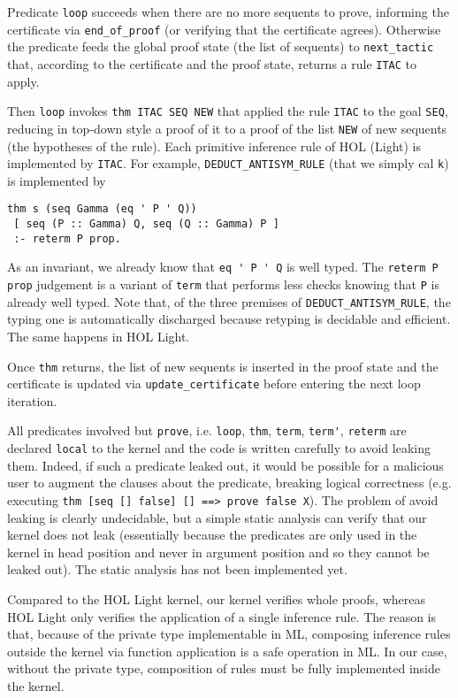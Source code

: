 \documentclass[preprint]{sigplanconf}
\begin{document}
Predicate \verb+loop+ succeeds when there are no more sequents to prove, informing the certificate via \verb+end_of_proof+ (or verifying that the certificate agrees). Otherwise the predicate feeds the global proof state (the list of sequents) to \verb+next_tactic+ that, according to the certificate and the proof state, returns a rule \verb+ITAC+ to apply.

Then \verb+loop+ invokes \verb+thm ITAC SEQ NEW+ that applied the rule \verb+ITAC+ to the goal \verb+SEQ+, reducing in top-down style a proof of it to a proof of the list \verb+NEW+ of new sequents (the hypotheses of the rule). Each primitive inference rule of HOL (Light) is implemented by \verb+ITAC+. For example, \verb+DEDUCT_ANTISYM_RULE+ (that we simply cal \verb+k+) is implemented by

{\small
\begin{verbatim}
thm s (seq Gamma (eq ' P ' Q))
 [ seq (P :: Gamma) Q, seq (Q :: Gamma) P ]
 :- reterm P prop.
\end{verbatim}}

As an invariant, we already know that \verb+eq ' P ' Q+ is well typed. The \verb+reterm P prop+ judgement is a variant of \verb+term+ that performs less checks knowing that \verb+P+ is already well typed. Note that, of the three premises of \verb+DEDUCT_ANTISYM_RULE+, the typing one is automatically discharged because retyping is decidable and efficient. The same happens in HOL Light.

Once \verb+thm+ returns, the list of new sequents is inserted in the
proof state and the certificate is updated via \verb+update_certificate+ before entering the next loop iteration.

All predicates involved but \verb+prove+, i.e. \verb+loop+, \verb+thm+, \verb+term+, \verb+term'+, \verb+reterm+ are declared \verb+local+ to the kernel and the code is written carefully to avoid leaking them. Indeed, if such a predicate leaked out, it would be possible for a malicious user to augment the clauses about the predicate, breaking logical correctness (e.g. executing \verb+thm [seq [] false] [] ==> prove false X+). The problem of avoid leaking is clearly undecidable, but a simple static analysis can verify that our kernel does not leak (essentially because the predicates are only used in the kernel in head position and never in argument position and so they cannot be leaked out). The static analysis has not been implemented yet.

Compared to the HOL Light kernel, our kernel verifies whole proofs, whereas HOL Light only verifies the application of a single inference rule. The reason is that, because of the private type implementable in ML, composing inference rules outside the kernel via function application is a safe operation in ML. In our case, without the private type, composition of rules must be fully implemented inside the kernel.
\end{document}
